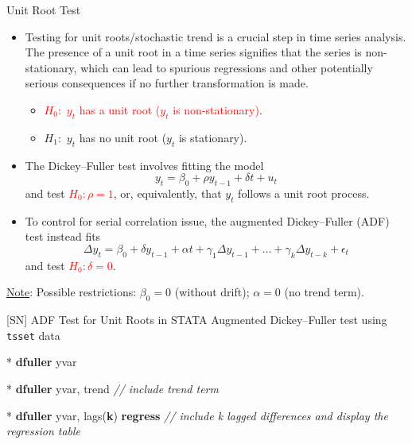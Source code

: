 \documentclass[
  10pt,
  ignorenonframetext,
]{beamer}
\newenvironment{Shaded}{\begin{snugshade}}{\end{snugshade}}
\newcommand{\CommentTok}[1]{\textcolor[rgb]{0.56,0.35,0.01}{\textit{#1}}}
\newcommand{\KeywordTok}[1]{\textcolor[rgb]{0.13,0.29,0.53}{\textbf{#1}}}
\newcommand{\NormalTok}[1]{#1}
\providecommand{\tightlist}{%
  \setlength{\itemsep}{0pt}\setlength{\parskip}{0pt}}
\begin{document}
\begin{frame}{Unit Root Test}
\protect\hypertarget{ADFtest}{}
\begin{itemize}
\item
  Testing for unit roots/stochastic trend is a crucial step in time
  series analysis. The presence of a unit root in a time series
  signifies that the series is non-stationary, which can lead to
  spurious regressions and other potentially serious consequences if no
  further transformation is made.

  \begin{itemize}
  \tightlist
  \item
    \textcolor{red}{$H_0:$ $y_t$ has a unit root ($y_t$ is non-stationary)}.
  \item
    \(H_1:\) \(y_t\) has no unit root (\(y_t\) is stationary).
  \end{itemize}
\item
  The Dickey--Fuller test involves fitting the model \[
  y_t = \beta_0 + \rho y_{t-1} + \delta t + u_t
  \] and test \textcolor{red}{$H_0: \rho = 1$}, or, equivalently, that
  \(y_t\) follows a unit root process.
\item
  To control for serial correlation issue, the augmented Dickey--Fuller
  (ADF) test instead fits \[
  \Delta y_t =  \beta_0 + \delta y_{t-1} + \alpha t + \gamma_1\Delta y_{t-1} + \ldots + \gamma_k\Delta y_{t-k} + \epsilon_t
  \] and test \textcolor{red}{$H_0: \delta = 0$}.
\end{itemize}

\qquad\footnotesize \underline{Note}: Possible restrictions:
\(\beta_0 = 0\) (without drift); \(\alpha =0\) (no trend term).
\end{frame}

\begin{frame}[fragile]{{[}SN{]} ADF Test for Unit Roots in STATA}
\protect\hypertarget{sn-adf-test-for-unit-roots-in-stata}{}
Augmented Dickey--Fuller test using \texttt{tsset} data \small

\begin{Shaded}
\begin{Highlighting}[]
\NormalTok{* }\KeywordTok{dfuller}\NormalTok{ yvar }
\end{Highlighting}
\end{Shaded}

\begin{Shaded}
\begin{Highlighting}[]
\NormalTok{* }\KeywordTok{dfuller}\NormalTok{ yvar, trend}
\CommentTok{// include trend term}
\end{Highlighting}
\end{Shaded}

\begin{Shaded}
\begin{Highlighting}[]
\NormalTok{* }\KeywordTok{dfuller}\NormalTok{ yvar, lags(}\KeywordTok{k}\NormalTok{) }\KeywordTok{regress}
\CommentTok{// include \textquotesingle{}k\textquotesingle{} lagged differences and display the regression table}
\end{Highlighting}
\end{Shaded}
\end{frame}
\end{document}
